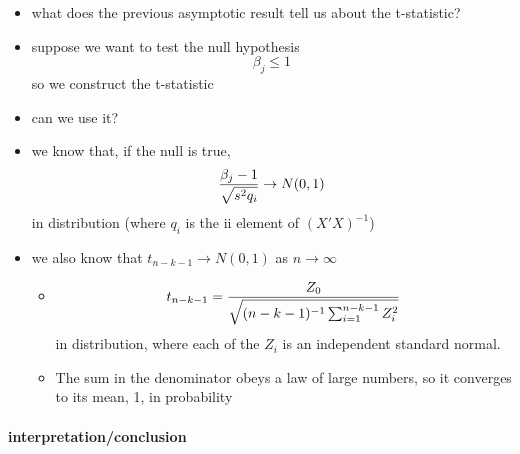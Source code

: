 \documentclass[11pt]{article}
\begin{document}
\begin{itemize}
\item what does the previous asymptotic result tell us about the t-statistic?
\item suppose we want to test the null hypothesis
         \[ \beta_j \leq 1 \] so we construct the t-statistic
\item can we use it?
\item we know that, if the null is true,
         \[ {\beta_j - 1 \over \sqrt{s^2 q_i}} \to N(0,1) \] in
         distribution (where $q_i$ is the ii element of $(X'X)^{-1}$)
\item we also know that $t_{n-k-1} \to N(0,1)$ as $n\to\infty$
\begin{itemize}
\item \[t_{n-k-1} = {Z_0 \over \sqrt{(n-k-1)^{-1} \sum_{i=1}^{n-k-1}
           Z_i^2}}\] in distribution, where each of the $Z_i$ is an
           independent standard normal.
\item The sum in the denominator obeys a law of large numbers, so
           it converges to its mean, 1, in probability
\end{itemize}
\end{itemize}
\paragraph{interpretation/conclusion}
\label{sec-3-1-1-2}
\end{document}
